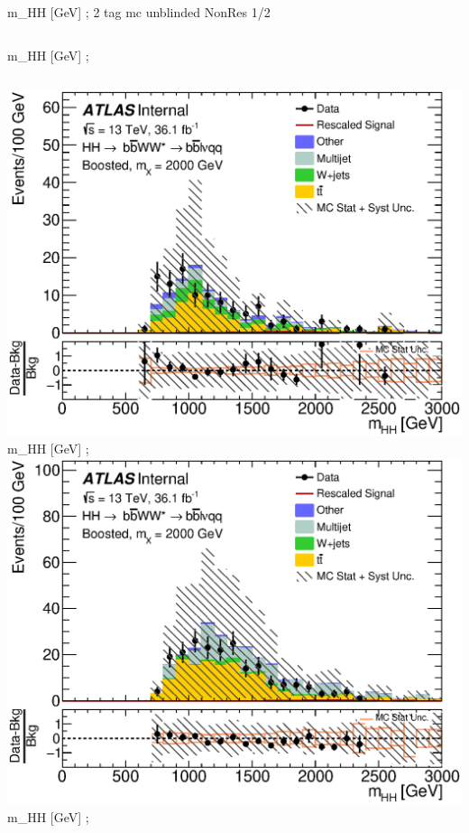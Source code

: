 \begin{frame}{m\_{HH} [GeV]  ; 2 tag mc unblinded NonRes 1/2}
\begin{columns}[c]
    m\_{HH} [GeV]  ; 
  \end{columns}
  \begin{columns}[c]
    \centering\includegraphics[width=\textwidth]{C_2tag_mbbcrLow_muon_presel_met50_hhMassRebin1}\\
    m\_{HH} [GeV]  ; 
    \centering\includegraphics[width=\textwidth]{C_2tag_mbbcrHigh_elec_presel_met50_hhMassRebin1}\\
    m\_{HH} [GeV]  ; 

\end{columns}
\end{frame}
